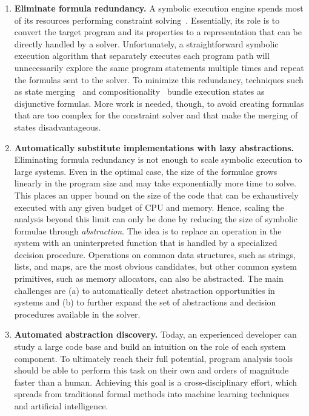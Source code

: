 \begin{enumerate}
\item \textbf{Eliminate formula redundancy.}  A symbolic execution engine spends most of its resources performing constraint solving~\cite{klee}.  Essentially, its role is to convert the target program and its properties to a representation that can be directly handled by a solver.
%
Unfortunately, a straightforward symbolic execution algorithm that separately executes each program path will unnecessarily explore the same program statements multiple times and repeat the formulas sent to the solver.
%
To minimize this redundancy, techniques such as state merging~\cite{state-merging} and compositionality~\cite{godefroid:compdyntest} bundle execution states as disjunctive formulas.
%
More work is needed, though, to avoid creating formulas that are too complex for the constraint solver and that make the merging of states disadvantageous.


\item \textbf{Automatically substitute implementations with lazy abstractions.}  Eliminating formula redundancy is not enough to scale symbolic execution to large systems.
%
Even in the optimal case, the size of the formulae grows linearly in the program size and may take exponentially more time to solve.  This places an upper bound on the size of the code that can be exhaustively executed with any given budget of CPU and memory.
%
Hence, scaling the analysis beyond this limit can only be done by reducing the size of symbolic formulae through \emph{abstraction}.  The idea is to replace an operation in the system with an uninterpreted function that is handled by a specialized decision procedure.
%
Operations on common data structures, such as strings, lists, and maps, are the most obvious candidates, but other common system primitives, such as memory allocators, can also be abstracted.  The main challenges are (a) to automatically detect abstraction opportunities in systems and (b) to further expand the set of abstractions and decision procedures available in the solver.

  
\item \textbf{Automated abstraction discovery.}  Today, an experienced developer can study a large code base and build an intuition on the role of each system component.
%
To ultimately reach their full potential, program analysis tools should be able to perform this task on their own and orders of magnitude faster than a human.
%
Achieving this goal is a cross-disciplinary effort, which spreads from traditional formal methods into machine learning techniques and artificial intelligence.
\end{enumerate}


